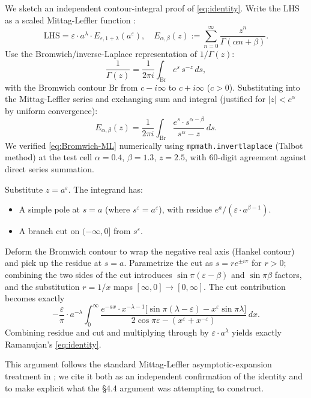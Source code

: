 \documentclass[11pt,reqno]{amsart}
\theoremstyle{definition}
\newcommand{\LHS}{\mathrm{LHS}}
\begin{document}
We sketch an independent contour-integral proof of
\cref{eq:identity}. Write the LHS as a scaled Mittag-Leffler function
\cite{GorenfloKilbasMainardiRogosin}:
\begin{equation}
\LHS = \varepsilon \cdot a^\lambda \cdot E_{\varepsilon, 1 + \lambda}(a^\varepsilon),
\quad
E_{\alpha, \beta}(z) := \sum_{n=0}^\infty \frac{z^n}{\Gamma(\alpha n + \beta)}.
\end{equation}
Use the Bromwich/inverse-Laplace representation of $1/\Gamma(z)$:
\[
\frac{1}{\Gamma(z)} = \frac{1}{2\pi i} \int_{\mathrm{Br}} e^s \, s^{-z}\,ds,
\]
with the Bromwich contour $\mathrm{Br}$ from $c - i\infty$ to $c + i\infty$
($c > 0$). Substituting into the Mittag-Leffler series and exchanging
sum and integral (justified for $|z| < c^\alpha$ by uniform
convergence):
\begin{equation}\label{eq:Bromwich-ML}
E_{\alpha, \beta}(z) = \frac{1}{2\pi i} \int_{\mathrm{Br}}
\frac{e^s \cdot s^{\alpha - \beta}}{s^\alpha - z}\,ds.
\end{equation}
We verified \cref{eq:Bromwich-ML} numerically using
\texttt{mpmath.invertlaplace} (Talbot method) at the test cell
$\alpha = 0.4$, $\beta = 1.3$, $z = 2.5$, with $60$-digit agreement
against direct series summation.

Substitute $z = a^\varepsilon$. The integrand has:
\begin{itemize}
\item A simple pole at $s = a$ (where $s^\varepsilon = a^\varepsilon$),
with residue $e^a / (\varepsilon \cdot a^{\beta - 1})$.
\item A branch cut on $(-\infty, 0]$ from $s^\varepsilon$.
\end{itemize}
Deform the Bromwich contour to wrap the negative real axis (Hankel
contour) and pick up the residue at $s = a$. Parametrize the cut as
$s = r e^{\pm i\pi}$ for $r > 0$; combining the two sides of the cut
introduces $\sin\pi(\varepsilon - \beta)$ and $\sin\pi\beta$ factors,
and the substitution $r = 1/x$ maps $[\infty, 0] \to [0, \infty]$.
The cut contribution becomes exactly
\[
-\frac{\varepsilon}{\pi} \cdot a^{-\lambda} \int_0^\infty
\frac{e^{-ax} \cdot x^{-\lambda - 1}
\bigl[\sin\pi(\lambda - \varepsilon) - x^\varepsilon \sin\pi\lambda\bigr]}
{2\cos\pi\varepsilon - (x^\varepsilon + x^{-\varepsilon})}\,dx.
\]
Combining residue and cut and multiplying through by
$\varepsilon \cdot a^\lambda$ yields exactly Ramanujan's
\cref{eq:identity}. \qedsymbol

This argument follows the standard Mittag-Leffler asymptotic-expansion
treatment in \cite{GorenfloKilbasMainardiRogosin}; we cite it both as
an independent confirmation of the identity and to make explicit what
the \S4.4 argument was attempting to construct.
\end{document}
